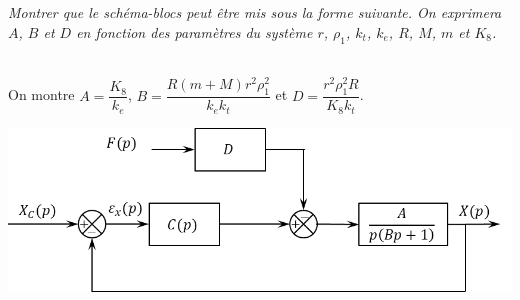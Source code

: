 \documentclass[10pt,fleqn]{article} %
\begin{document}
\begin{multicols}{2}
\subparagraph{}\textit{Montrer que le schéma-blocs peut être mis sous la forme suivante. On exprimera $A$, $B$ et $D$ en fonction des paramètres du système $r$, $\rho_1$, $k_t$, $k_e$, $R$, $M$, $m$ et $K_8$. }
\ifprof
\begin{corrige}~\\
%
%
%
%
%
%
%
%
%
%
%
%
%
%
%
%
%

On montre $A=\dfrac{K_8}{k_e}$, $B=\dfrac{R\left(m+M\right)r^2\rho_1^2}{k_ek_t}$ et $D=\dfrac{r^2\rho_1^2R}{K_8k_t}$.
\end{corrige}
\else
\fi

\begin{center}
\includegraphics[width=\linewidth]{images/fig_08}
\end{center}


\end{multicols}
\end{document}

